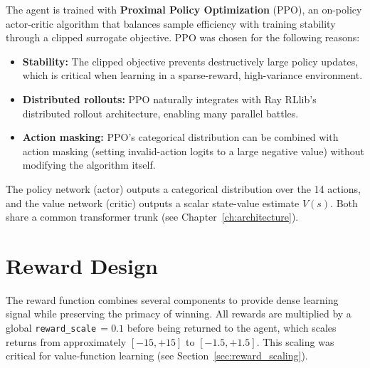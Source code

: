 The agent is trained with \textbf{Proximal Policy Optimization} (PPO), an
on-policy actor-critic algorithm that balances sample efficiency with training
stability through a clipped surrogate objective.  PPO was chosen for the
following reasons:

\begin{itemize}
  \item \textbf{Stability:} The clipped objective prevents destructively large
        policy updates, which is critical when learning in a sparse-reward,
        high-variance environment.
  \item \textbf{Distributed rollouts:} PPO naturally integrates with Ray
        RLlib's distributed rollout architecture, enabling many parallel
        battles.
  \item \textbf{Action masking:} PPO's categorical distribution can be
        combined with action masking (setting invalid-action logits to a large
        negative value) without modifying the algorithm itself.
\end{itemize}

The policy network (actor) outputs a categorical distribution over the 14
actions, and the value network (critic) outputs a scalar state-value estimate
$V(s)$.  Both share a common transformer trunk (see
Chapter~\ref{ch:architecture}).

\section{Reward Design}
\label{sec:reward_design}

The reward function combines several components to provide dense learning signal
while preserving the primacy of winning.  All rewards are multiplied by a
global \texttt{reward\_scale}$\,=0.1$ before being returned to the agent, which
scales returns from approximately $[-15, +15]$ to $[-1.5, +1.5]$.  This scaling
was critical for value-function learning (see
Section~\ref{sec:reward_scaling}).


